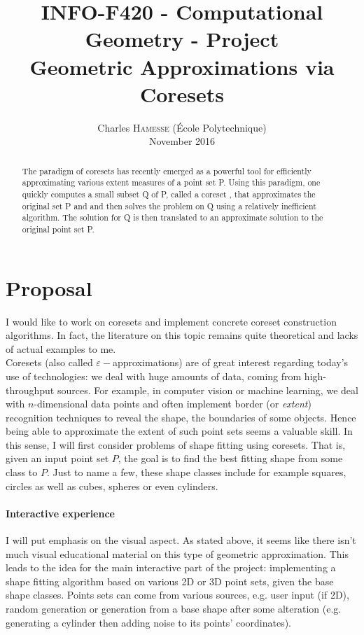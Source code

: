 \documentclass[a4paper,10pt]{article}
\title{INFO-F420 - Computational Geometry - Project\\Geometric Approximations via Coresets}
\date{\vspace{-7ex}
Charles \textsc{Hamesse} (École Polytechnique)\\
\vspace{2ex}November 2016}
\begin{document}
\maketitle
\begin{abstract}
    The paradigm of coresets has recently emerged as a powerful tool for efficiently approximating various extent measures of a point set P. Using this paradigm, one quickly computes a small subset Q of P, called a coreset , that approximates the original set P and and then solves the problem on Q using a relatively inefficient algorithm. The solution for Q is then translated to an approximate solution to the original point set P. 
\end{abstract}


\section{Proposal}
I would like to work on coresets and implement concrete coreset construction algorithms. In fact, the literature on this topic remains quite theoretical and lacks of actual examples to me.\\

Coresets (also called $\varepsilon-$approximations) are of great interest regarding today's use of technologies: we deal with huge amounts of data, coming from high-throughput sources. For example, in computer vision or machine learning, we deal with $n$-dimensional data points and often implement border (or \textit{extent}) recognition techniques to reveal the shape, the boundaries of some objects. Hence being able to approximate the extent of such point sets seems a valuable skill. In this sense, I will first consider problems of shape fitting using coresets. That is, given an input point set $P$, the goal is to find the best fitting shape from some class to $P$. Just to name a few, these shape classes include for example squares, circles as well as cubes, spheres or even cylinders.

\paragraph{Interactive experience} I will put emphasis on the visual aspect. As stated above, it seems like there isn't much visual educational material on this type of geometric approximation. This leads to the idea for the main interactive part of the project: implementing a shape fitting algorithm based on various 2D or 3D point sets, given the base shape classes. Points sets can come from various sources, e.g. user input (if 2D), random generation or generation from a base shape after some alteration (e.g. generating a cylinder then adding noise to its points' coordinates).\\
\end{document}
